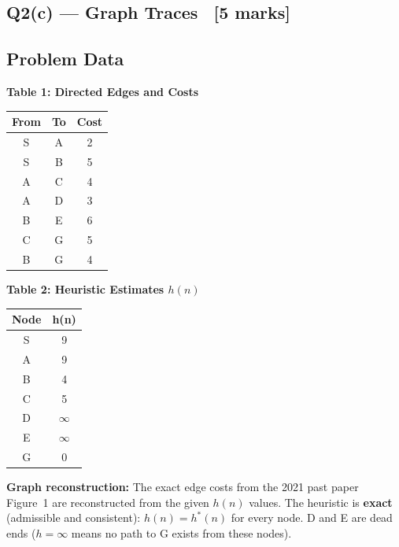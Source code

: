 \documentclass[12pt, a4paper]{article}
\newenvironment{notesbox}{\begin{mdframed}[style=notesframe]}{\end{mdframed}}
\begin{document}
\subsection{Q2(c) — Graph Traces \ [5 marks]}

\subsection*{Problem Data}

\begin{minipage}[t]{0.46\textwidth}
\centering
{\small\textbf{Table 1: Directed Edges and Costs}}\\[0.4em]
\begin{tabular}{ccc}
\toprule
\textbf{From} & \textbf{To} & \textbf{Cost} \\
\midrule
S & A & 2 \\
S & B & 5 \\
A & C & 4 \\
A & D & 3 \\
B & E & 6 \\
C & G & 5 \\
B & G & 4 \\
\bottomrule
\end{tabular}
\end{minipage}
\hfill
\begin{minipage}[t]{0.46\textwidth}
\centering
{\small\textbf{Table 2: Heuristic Estimates $h(n)$}}\\[0.4em]
\begin{tabular}{cc}
\toprule
\textbf{Node} & \textbf{h(n)} \\
\midrule
S & 9 \\
A & 9 \\
B & 4 \\
C & 5 \\
D & $\infty$ \\
E & $\infty$ \\
G & 0 \\
\bottomrule
\end{tabular}
\end{minipage}

\vspace{0.6em}
\begin{notesbox}
\textbf{Graph reconstruction:} The exact edge costs from the 2021 past paper Figure~1 are reconstructed from the given $h(n)$ values. The heuristic is \textbf{exact} (admissible and consistent): $h(n) = h^*(n)$ for every node. D and E are dead ends ($h{=}\infty$ means no path to G exists from these nodes).
\end{notesbox}
\end{document}
